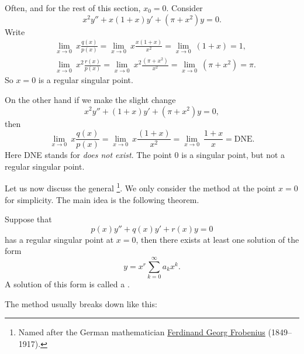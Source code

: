 \documentclass{ximera}
\begin{document}
\begin{example}
    Often, and for the rest of this section, $x_0 = 0$.  Consider
    \begin{equation*}
        x^2y'' + x(1+x)y' + (\pi+x^2)y = 0 .
    \end{equation*}
    Write
    \begin{align*}
        & \lim_{x \to 0} ~x \frac{q(x)}{p(x)} = \lim_{x \to 0} ~x \frac{x(1+x)}{x^2} = \lim_{x \to 0} ~(1+x) = 1 , \\
        & \lim_{x \to 0} ~x^2 \frac{r(x)}{p(x)} = \lim_{x \to 0} ~x^2 \frac{(\pi+x^2)}{x^2} = \lim_{x \to 0} ~(\pi+x^2) = \pi .
    \end{align*}
    So $x = 0$ is a regular singular point.
    
    On the other hand if we make the slight change
    \begin{equation*}
        x^2y'' + (1+x)y' + (\pi+x^2)y = 0 ,
    \end{equation*}
    then
    \begin{equation*}
        \lim_{x \to 0} ~x \frac{q(x)}{p(x)} = \lim_{x \to 0} ~x \frac{(1+x)}{x^2} = \lim_{x \to 0} ~\frac{1+x}{x} = \text{DNE}.
    \end{equation*}
    Here DNE stands for \emph{does not exist}. The point $0$ is a singular point, but not a regular singular point.
\end{example}

Let us now discuss the general \emph{}%
\footnote{
    Named after the German mathematician \href{http://en.wikipedia.org/wiki/Ferdinand_Georg_Frobenius}{Ferdinand Georg Frobenius} (1849--1917).
    }. 
We only consider the method at the point $x=0$ for simplicity.  The main idea is the following theorem.

\begin{theorem}
    Suppose that 
    \begin{equation} \label{eq:frobeniusmethod}
        p(x) y'' + q(x) y' + r(x) y = 0
    \end{equation}
    has a regular singular point at $x=0$, then there exists at least one solution of the form
    \begin{equation*}
        y = x^r \sum_{k=0}^\infty a_k x^k .
    \end{equation*}
    A solution of this form is called a \emph{}.
\end{theorem}

The method usually breaks down like this:
\end{document}
